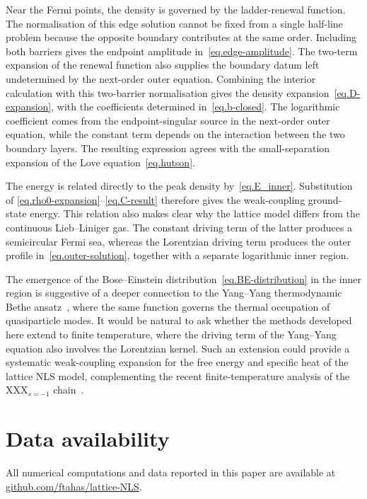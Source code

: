 \documentclass[11pt,a4paper]{article}
\theoremstyle{definition}
\begin{document}
Near the Fermi points, the density is governed by the ladder-renewal function.
The normalisation of this edge solution cannot be fixed from a single
half-line problem because the opposite boundary contributes at the same
order. Including both barriers gives the endpoint amplitude
in~\eqref{eq.edge-amplitude}. The two-term expansion of the renewal function
also supplies the boundary datum left undetermined by the next-order outer
equation. Combining the interior calculation with this two-barrier
normalisation gives the density expansion~\eqref{eq.D-expansion}, with the
coefficients determined in~\eqref{eq.b-closed}. The logarithmic coefficient
comes from the endpoint-singular source in the next-order outer equation,
while the constant term depends on the interaction between the two boundary
layers. The resulting expression agrees with the small-separation expansion
of the Love equation~\eqref{eq.hutson}.

The energy is related directly to the peak density
by~\eqref{eq.E_inner}. Substitution of
\eqref{eq.rho0-expansion}--\eqref{eq.C-result} therefore gives the
weak-coupling ground-state energy. This relation also makes clear why the
lattice model differs from the continuous Lieb--Liniger gas. The constant
driving term of the latter produces a semicircular Fermi sea, whereas the
Lorentzian driving term produces the outer profile
in~\eqref{eq.outer-solution}, together with a separate logarithmic inner
region.

The emergence of the Bose--Einstein distribution~\eqref{eq.BE-distribution} in the
inner region is suggestive of a deeper connection to the Yang--Yang
thermodynamic Bethe ansatz~\cite{YangYang1969,Zamolodchikov1990}, where
the same function governs the thermal occupation of quasiparticle modes.
It would be natural to ask whether the methods developed here extend to finite temperature, where the driving term
of the Yang--Yang equation also involves the Lorentzian kernel.
Such an extension could provide a systematic weak-coupling expansion for
the free energy and specific heat of the lattice NLS model, complementing
the recent finite-temperature analysis of the XXX$_{s=-1}$ chain~\cite{ZhongEtAl2025}.






\section*{Data availability}
All numerical computations and data reported in this paper are available at
\href{https://github.com/ftahas/lattice-NLS}{github.com/ftahas/lattice-NLS}.
\end{document}
